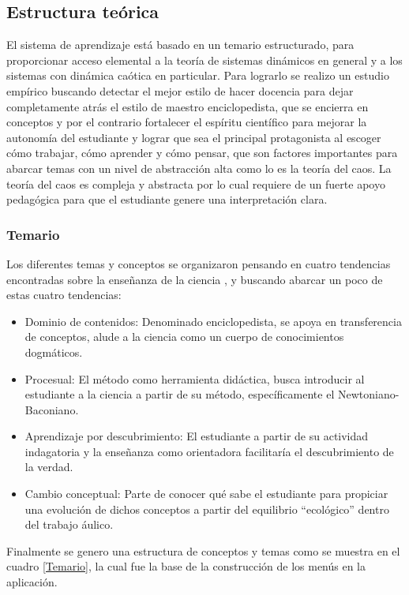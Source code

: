 \documentclass[letterpaper, 11pt, oneside]{article}
\theoremstyle{definition}
\theoremstyle{remark}
\begin{document}
\clearpage
\subsection{Estructura teórica}

El sistema de aprendizaje está basado en un temario estructurado, para proporcionar acceso elemental a la teoría de sistemas dinámicos en general y a los sistemas con dinámica caótica en particular. Para lograrlo se realizo un estudio empírico buscando detectar el mejor estilo de hacer docencia para dejar completamente atrás el estilo de maestro enciclopedista, que se encierra en conceptos y por el contrario fortalecer el espíritu científico para mejorar la autonomía del estudiante y lograr que sea el principal protagonista al escoger cómo trabajar, cómo aprender y cómo pensar, que son factores importantes para abarcar temas con un nivel de abstracción alta como lo es la teoría del caos. La teoría del caos es compleja y abstracta por lo cual requiere de un fuerte apoyo pedagógica para que el estudiante genere una interpretación clara.

\subsubsection{Temario}

Los diferentes temas y conceptos se organizaron pensando en cuatro tendencias encontradas sobre la enseñanza de la ciencia \cite{SANCHEZ}, y buscando abarcar un poco de estas cuatro tendencias:

\begin{itemize}
  \item Dominio de contenidos: Denominado enciclopedista, se apoya en transferencia de conceptos, alude a la ciencia como un cuerpo de conocimientos dogmáticos.
  \item Procesual: El método como herramienta didáctica, busca introducir al estudiante a la ciencia a partir de su método, específicamente el Newtoniano-Baconiano.
  \item Aprendizaje por descubrimiento: El estudiante a partir de su actividad indagatoria y la enseñanza como orientadora facilitaría el descubrimiento de la verdad.
  \item Cambio conceptual: Parte de conocer qué sabe el estudiante para propiciar una evolución de dichos conceptos a partir del equilibrio “ecológico” dentro del trabajo áulico.
\end{itemize}

Finalmente se genero una estructura de conceptos y temas como se muestra en el cuadro \ref{Temario}, la cual fue la base de la construcción de los menús en la aplicación.
\end{document}
